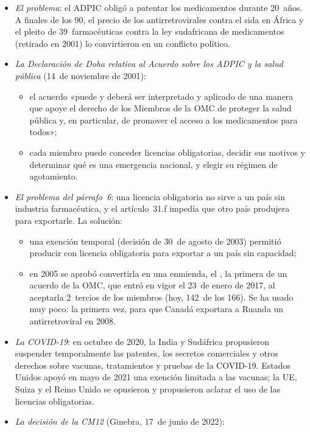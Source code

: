 \documentclass[11pt]{article}
\begin{document}
\begin{itemize}
\item \emph{El problema}: el ADPIC obligó a patentar los medicamentos durante 20~años. A finales de los 90, el precio de los antirretrovirales contra el sida en África y el pleito de 39~farmacéuticas contra la ley sudafricana de medicamentos (retirado en 2001) lo convirtieron en un conflicto político.
\item \emph{La Declaración de Doha relativa al Acuerdo sobre los ADPIC y la salud pública} (14~de noviembre de 2001)\nocite{OMC2001DeclaracionDoha}:
  \begin{itemize}
  \item el acuerdo «puede y deberá ser interpretado y aplicado de una manera que apoye el derecho de los Miembros de la OMC de proteger la salud pública y, en particular, de promover el acceso a los medicamentos para todos»;
  \item cada miembro puede conceder licencias obligatorias, decidir sus motivos y determinar qué es una emergencia nacional, y elegir su régimen de agotamiento.
  \end{itemize}
\item \emph{El problema del párrafo~6}: una licencia obligatoria no sirve a un país sin industria farmacéutica, y el artículo~31.f impedía que otro país produjera para exportarle. La solución:
  \begin{itemize}
  \item una exención temporal (decisión de 30~de agosto de 2003) permitió producir con licencia obligatoria para exportar a un país sin capacidad;
  \item en 2005 se aprobó convertirla en una enmienda, el , la primera de un acuerdo de la OMC, que entró en vigor el 23~de enero de 2017, al aceptarla 2~tercios de los miembros (hoy, 142~de los 166)\nocite{OMC2026Articulo31bis}. Se ha usado muy poco: la primera vez, para que Canadá exportara a Ruanda un antirretroviral en 2008.
  \end{itemize}
\item \emph{La COVID-19}: en octubre de 2020, la India y Sudáfrica propusieron suspender temporalmente las patentes, los secretos comerciales y otros derechos sobre vacunas, tratamientos y pruebas de la COVID-19. Estados Unidos apoyó en mayo de 2021 una exención limitada a las vacunas; la UE, Suiza y el Reino Unido se opusieron y propusieron aclarar el uso de las licencias obligatorias\nocite{CE2021ADPICCOVID}.
\item \emph{La decisión de la CM12} (Ginebra, 17~de junio de 2022)\nocite{OMC2022DecisionADPIC}:

\end{itemize}
\end{document}

